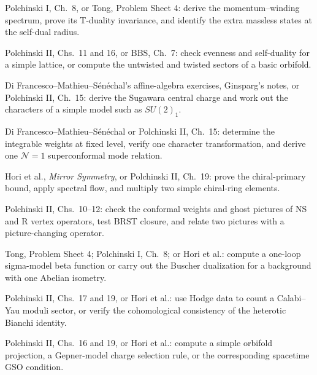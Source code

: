 \documentclass[11pt]{article}
\begin{document}
\begin{description}[leftmargin=2.1cm,labelwidth=1.55cm,labelsep=0.35cm,align=left,itemsep=4pt]
  \item[Week 15] Polchinski I, Ch.~8, or Tong, Problem Sheet 4: derive the
  momentum--winding spectrum, prove its T-duality invariance, and identify the
  extra massless states at the self-dual radius.

  \item[Week 16] Polchinski II, Chs.~11 and 16, or BBS, Ch.~7: check evenness
  and self-duality for a simple lattice, or
  compute the untwisted and twisted sectors of a basic orbifold.

  \item[Week 17] Di Francesco--Mathieu--S\'en\'echal's affine-algebra exercises,
  Ginsparg's notes, or Polchinski II, Ch.~15: derive the Sugawara central charge
  and work out the characters of a simple model such as $SU(2)_1$.

  \item[Week 18] Di Francesco--Mathieu--S\'en\'echal or Polchinski II, Ch.~15:
  determine the integrable weights at fixed level, verify one character
  transformation, and derive one $\mathcal N=1$ superconformal mode relation.

  \item[Week 19] Hori et al., \emph{Mirror Symmetry}, or Polchinski II, Ch.~19:
  prove the chiral-primary bound, apply spectral flow, and multiply two simple
  chiral-ring elements.

  \item[Week 20] Polchinski II, Chs.~10--12: check the conformal weights and
  ghost pictures of NS and R vertex operators, test BRST closure, and relate two
  pictures with a picture-changing operator.

  \item[Week 21] Tong, Problem Sheet 4; Polchinski I, Ch.~8; or Hori et al.:
  compute a one-loop sigma-model beta function or carry out the Buscher
  dualization for a background with one Abelian isometry.

  \item[Week 22] Polchinski II, Chs.~17 and 19, or Hori et al.: use Hodge data
  to count a Calabi--Yau moduli sector, or verify the cohomological consistency
  of the heterotic Bianchi identity.

  \item[Week 23] Polchinski II, Chs.~16 and 19, or Hori et al.: compute a simple
  orbifold projection, a Gepner-model charge selection rule, or the corresponding
  spacetime GSO condition.


\end{description}
\end{document}
